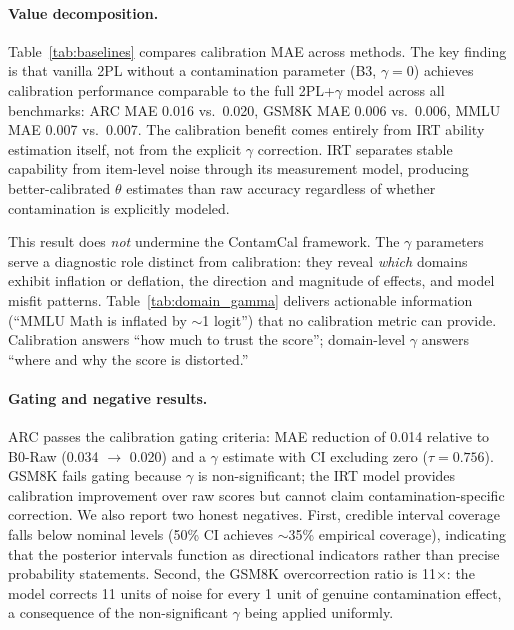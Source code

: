 \paragraph{Value decomposition.}
Table~\ref{tab:baselines} compares calibration MAE across methods. The key finding is that vanilla 2PL without a contamination parameter (B3, $\gamma = 0$) achieves calibration performance comparable to the full 2PL+$\gamma$ model across all benchmarks: ARC MAE 0.016 vs.\ 0.020, GSM8K MAE 0.006 vs.\ 0.006, MMLU MAE 0.007 vs.\ 0.007. The calibration benefit comes entirely from IRT ability estimation itself, not from the explicit $\gamma$ correction. IRT separates stable capability from item-level noise through its measurement model, producing better-calibrated $\theta$ estimates than raw accuracy regardless of whether contamination is explicitly modeled.

This result does \textit{not} undermine the ContamCal framework. The $\gamma$ parameters serve a diagnostic role distinct from calibration: they reveal \textit{which} domains exhibit inflation or deflation, the direction and magnitude of effects, and model misfit patterns. Table~\ref{tab:domain_gamma} delivers actionable information (``MMLU Math is inflated by $\sim$1 logit'') that no calibration metric can provide. Calibration answers ``how much to trust the score''; domain-level $\gamma$ answers ``where and why the score is distorted.''

\paragraph{Gating and negative results.}
ARC passes the calibration gating criteria: MAE reduction of 0.014 relative to B0-Raw (0.034 $\to$ 0.020) and a $\gamma$ estimate with CI excluding zero ($\tau = 0.756$). GSM8K fails gating because $\gamma$ is non-significant; the IRT model provides calibration improvement over raw scores but cannot claim contamination-specific correction. We also report two honest negatives. First, credible interval coverage falls below nominal levels (50\% CI achieves $\sim$35\% empirical coverage), indicating that the posterior intervals function as directional indicators rather than precise probability statements. Second, the GSM8K overcorrection ratio is 11$\times$: the model corrects 11 units of noise for every 1 unit of genuine contamination effect, a consequence of the non-significant $\gamma$ being applied uniformly.

